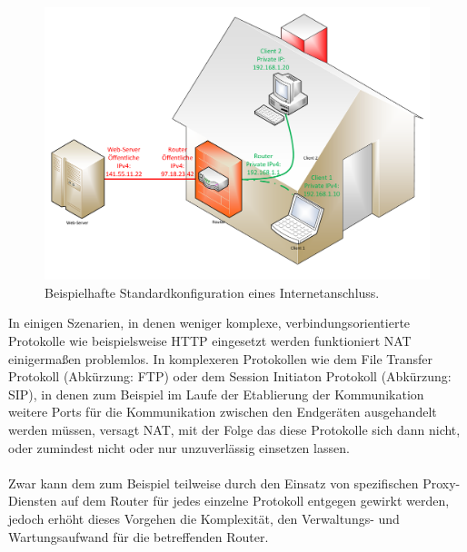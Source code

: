 \documentclass[a4paper,12pt]{scrartcl}
\begin{document}
\begin{figure}[htb]
\begin{center}
 \includegraphics[width=1\hsize]{./Zeichnungen/IPv4NAT.pdf}
 \end{center}
\caption[Beispielhafte Standardkonfiguration eines Internetanschluss mit NAT, Quelle: Autor, verwendete Symbole unterliegen der
GPL]{\label{stdinetv4}Beispielhafte Standardkonfiguration eines Internetanschluss.}
\end{figure}

In einigen Szenarien, in denen weniger komplexe, verbindungsorientierte Protokolle wie beispielsweise HTTP eingesetzt werden funktioniert NAT einigermaßen problemlos. In komplexeren Protokollen wie dem File Transfer Protokoll (Abk\"urzung: FTP) oder dem Session Initiaton Protokoll (Abk\"urzung: SIP), in denen zum Beispiel im Laufe der Etablierung der Kommunikation weitere Ports f\"ur die Kommunikation zwischen den Endger\"aten ausgehandelt werden m\"ussen, versagt NAT, mit der Folge das diese Protokolle sich dann nicht, oder zumindest nicht oder nur unzuverlässig einsetzen lassen.\\
\\
Zwar kann dem zum Beispiel teilweise durch den Einsatz von spezifischen Proxy-Diensten auf dem Router f\"ur jedes einzelne Protokoll entgegen gewirkt werden, jedoch erhöht dieses Vorgehen die Komplexit\"at, den Verwaltungs- und Wartungsaufwand f\"ur die betreffenden Router.
\end{document}
